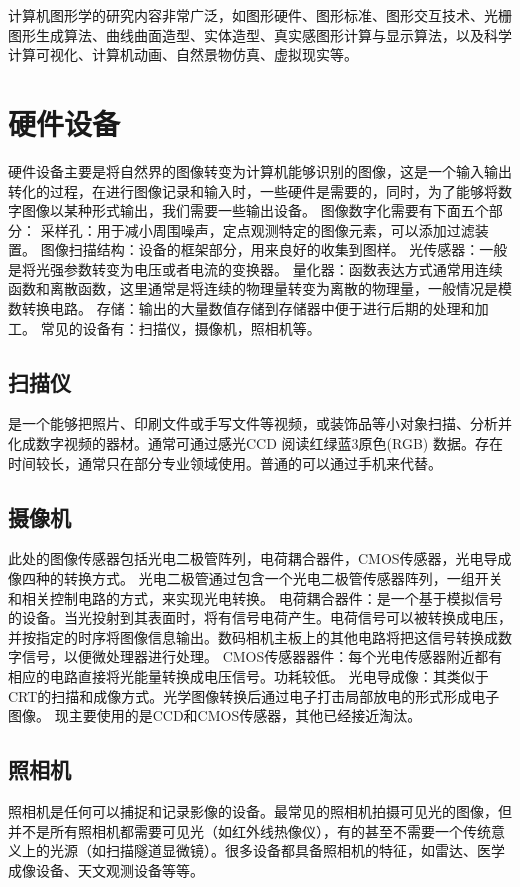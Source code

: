 \documentclass[UTF8]{article}
\begin{document}
计算机图形学的研究内容非常广泛，如图形硬件、图形标准、图形交互技术、光栅图形生成算法、曲线曲面造型、实体造型、真实感图形计算与显示算法，以及科学计算可视化、计算机动画、自然景物仿真、虚拟现实等。

\section{硬件设备}
硬件设备主要是将自然界的图像转变为计算机能够识别的图像，这是一个输入输出转化的过程，在进行图像记录和输入时，一些硬件是需要的，同时，为了能够将数字图像以某种形式输出，我们需要一些输出设备。
图像数字化需要有下面五个部分：
采样孔：用于减小周围噪声，定点观测特定的图像元素，可以添加过滤装置。
图像扫描结构：设备的框架部分，用来良好的收集到图样。
光传感器：一般是将光强参数转变为电压或者电流的变换器。
量化器：函数表达方式通常用连续函数和离散函数，这里通常是将连续的物理量转变为离散的物理量，一般情况是模数转换电路。
存储：输出的大量数值存储到存储器中便于进行后期的处理和加工。
常见的设备有：扫描仪，摄像机，照相机等。


\subsection{扫描仪}
是一个能够把照片、印刷文件或手写文件等视频，或装饰品等小对象扫描、分析并化成数字视频的器材。通常可通过感光CCD 阅读红绿蓝3原色(RGB) 数据。存在时间较长，通常只在部分专业领域使用。普通的可以通过手机来代替。
\subsection{摄像机}
此处的图像传感器包括光电二极管阵列，电荷耦合器件，CMOS传感器，光电导成像四种的转换方式。
光电二极管通过包含一个光电二极管传感器阵列，一组开关和相关控制电路的方式，来实现光电转换。
电荷耦合器件：是一个基于模拟信号的设备。当光投射到其表面时，将有信号电荷产生。电荷信号可以被转换成电压，并按指定的时序将图像信息输出。数码相机主板上的其他电路将把这信号转换成数字信号，以便微处理器进行处理。
CMOS传感器器件：每个光电传感器附近都有相应的电路直接将光能量转换成电压信号。功耗较低。
光电导成像：其类似于CRT的扫描和成像方式。光学图像转换后通过电子打击局部放电的形式形成电子图像。
现主要使用的是CCD和CMOS传感器，其他已经接近淘汰。
\subsection{照相机}
照相机是任何可以捕捉和记录影像的设备。最常见的照相机拍摄可见光的图像，但并不是所有照相机都需要可见光（如红外线热像仪），有的甚至不需要一个传统意义上的光源（如扫描隧道显微镜）。很多设备都具备照相机的特征，如雷达、医学成像设备、天文观测设备等等。
\end{document}
